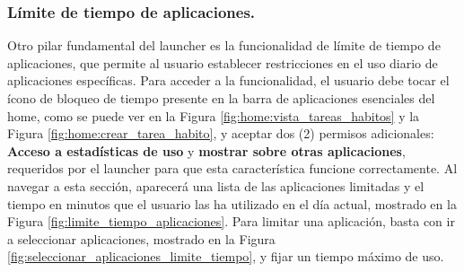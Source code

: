 \subsubsection{Límite de tiempo de aplicaciones.}

Otro pilar fundamental del launcher es la funcionalidad de límite de tiempo de aplicaciones, que permite al usuario establecer restricciones en el uso diario de aplicaciones específicas. Para acceder a la funcionalidad, el usuario debe tocar el ícono de bloqueo de tiempo presente en la barra de aplicaciones esenciales del home, como se puede ver en la Figura \ref{fig:home:vista_tareas_habitos} y la Figura \ref{fig:home:crear_tarea_habito}, y aceptar dos (2) permisos adicionales: \textbf{Acceso a estadísticas de uso} y \textbf{mostrar sobre otras aplicaciones}, requeridos por el launcher para que esta característica funcione correctamente. Al navegar a esta sección, aparecerá una lista de las aplicaciones limitadas y el tiempo en minutos que el usuario las ha utilizado en el día actual, mostrado en la Figura \ref{fig:limite_tiempo_aplicaciones}. Para limitar una aplicación, basta con ir a seleccionar aplicaciones, mostrado en la Figura \ref{fig:seleccionar_aplicaciones_limite_tiempo}, y fijar un tiempo máximo de uso.



